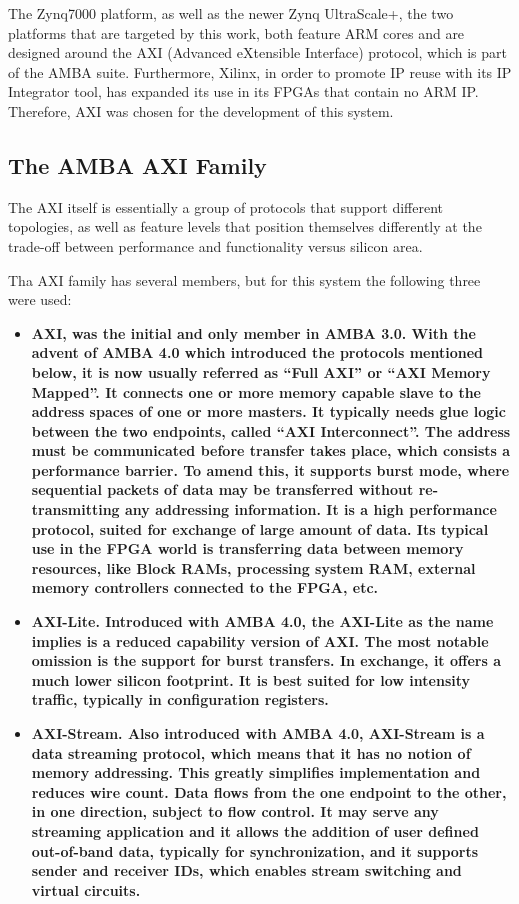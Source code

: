 The Zynq7000 platform, as well as the newer Zynq UltraScale+, the two platforms that are targeted by this work,
both feature ARM cores and are designed around the AXI (Advanced eXtensible Interface) protocol, 
which is part of the AMBA suite. 
Furthermore, Xilinx, in order to promote IP reuse with its IP Integrator tool, has expanded its use
in its FPGAs that contain no ARM IP. Therefore, AXI was chosen for the development of this system.

\subsection{The AMBA AXI Family}

The AXI itself is essentially a group of protocols that support different topologies,
as well as feature levels that position themselves differently at the trade-off 
between performance and functionality versus silicon area.

Tha AXI family has several members, but for this system the following three were used:
\begin{itemize}
\item	\bf{AXI}, was the initial and only member in AMBA 3.0. With the advent of AMBA 4.0 which introduced
	the protocols mentioned below, it is now usually referred as ``Full AXI'' or ``AXI Memory Mapped''.
	It connects one or more memory capable slave to the address spaces of 
	one or more masters. It typically needs glue logic between the two endpoints, called ``AXI Interconnect''. 
	The address must be communicated before transfer takes place, which consists a performance barrier.
	To amend this, it supports burst mode, where sequential packets of data may be transferred without
	re-transmitting any addressing information. It is a high performance protocol, suited for exchange
	of large amount of data. Its typical use in the FPGA world is transferring data between memory resources,
	like Block RAMs, processing system RAM, external memory controllers connected to the FPGA, etc.
\item	\bf{AXI-Lite}. Introduced with AMBA 4.0, the AXI-Lite as the name implies is a reduced capability
	version of AXI. The most notable omission is the support for burst transfers. In exchange, it offers
	a much lower silicon footprint. It is best suited for low intensity traffic, typically in configuration
	registers.
\item	\bf{AXI-Stream}. Also introduced with AMBA 4.0, AXI-Stream is a data streaming protocol, which means
	that it has no notion of memory addressing. This greatly simplifies implementation and reduces wire
	count. Data flows from the one endpoint to the other, in one direction, subject to flow control.
	It may serve any streaming application and it allows the addition of user defined out-of-band data,
	typically for synchronization, and it supports sender and receiver IDs, 
	which enables stream switching and virtual circuits.
\end{itemize}

